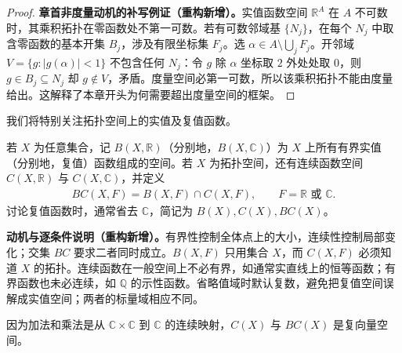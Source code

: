 \documentclass[../../main.tex]{subfiles}%
\begin{document}
\begin{proof}
\textbf{章首非度量动机的补写例证（重构新增）。}实值函数空间 $\mathbb R^A$ 在 $A$ 不可数时，其乘积拓扑在零函数处不第一可数。若有可数邻域基 $\{N_j\}$，在每个 $N_j$ 中取含零函数的基本开集 $B_j$，涉及有限坐标集 $F_j$。选 $\alpha\in A\setminus\bigcup_jF_j$。开邻域 $V=\{g:|g(\alpha)|<1\}$ 不包含任何 $N_j$：令 $g$ 除 $\alpha$ 坐标取 $2$ 外处处取 $0$，则 $g\in B_j\subseteq N_j$ 却 $g\notin V$，矛盾。度量空间必第一可数，所以该乘积拓扑不能由度量给出。这解释了本章开头为何需要超出度量空间的框架。
\end{proof}
我们将特别关注拓扑空间上的实值及复值函数。
\begin{definition}[有界函数与有界连续函数的空间]\label{definition:ch04-bounded-continuous-spaces}
若 $X$ 为任意集合，记 $B(X,\mathbb R)$（分别地，$B(X,\mathbb C)$）为 $X$ 上所有有界实值（分别地，复值）函数组成的空间。若 $X$ 为拓扑空间，还有连续函数空间 $C(X,\mathbb R)$ 与 $C(X,\mathbb C)$，并定义
\begin{align*}
BC(X,F)=B(X,F)\cap C(X,F),\qquad F=\mathbb R\text{ 或 }\mathbb C.
\end{align*}
讨论复值函数时，通常省去 $\mathbb C$，简记为 $B(X),C(X),BC(X)$。
\end{definition}
\begin{remark}
\textbf{动机与逐条件说明（重构新增）。}有界性控制全体点上的大小，连续性控制局部变化；交集 $BC$ 要求二者同时成立。$B(X,F)$ 只用集合 $X$，而 $C(X,F)$ 必须知道 $X$ 的拓扑。连续函数在一般空间上不必有界，如通常实直线上的恒等函数；有界函数也未必连续，如 $\mathbb Q$ 的示性函数。省略值域时默认复数，避免把复值空间误解成实值空间；两者的标量域相应不同。
\end{remark}
\begin{proposition}\label{proposition:ch04-continuous-vector-spaces}
因为加法和乘法是从 $\mathbb C\times\mathbb C$ 到 $\mathbb C$ 的连续映射，$C(X)$ 与 $BC(X)$ 是复向量空间。
\end{proposition}
\end{document}
